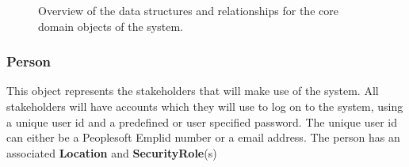 \documentclass[12pt]{article}
\begin{document}
\begin{figure}[H]
\centering	
{}
\caption{Overview of the data structures and relationships for the core domain objects of the
system.}
\end{figure}

\newpage
\subsubsection{Person}
This object represents the stakeholders that will make use of the system. All stakeholders will have accounts which they will use to log on to the system, using a unique user id and a predefined or user specified password. The unique user id can either be a Peoplesoft Emplid number or a email address. The person has an associated \textbf{Location} and \textbf{SecurityRole}(s)
\end{document}
